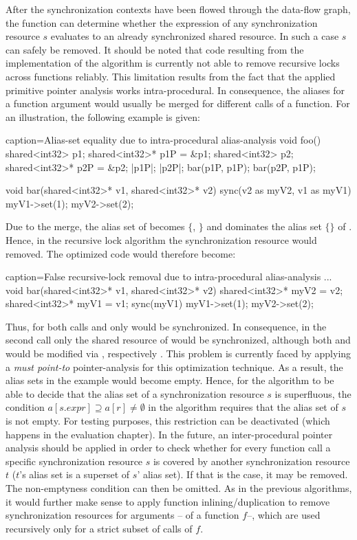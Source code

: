 After the synchronization contexts have been flowed through the data-flow graph, the function can determine whether the expression of any synchronization resource $s$ evaluates to an already synchronized shared resource. In such a case $s$ can safely be removed. It should be noted that code resulting from the implementation of the algorithm is currently not able to remove recursive locks across functions reliably. This limitation results from the fact that the applied primitive pointer analysis works intra-procedural. In consequence, the aliases for a function argument would usually be merged for different calls of a function. For an illustration, the following example is given:
\begin{ccode}{caption=Alias-set equality due to intra-procedural alias-analysis}
void foo() {
  shared<int32> p1; 
  shared<int32>* p1P = &p1; 
  shared<int32> p2; 
  shared<int32>* p2P = &p2;
  |p1P|; 
  |p2P|;
  bar(p1P, p1P);
  bar(p2P, p1P);
}

void bar(shared<int32>* v1, shared<int32>* v2) { 
  sync(v2 as myV2, v1 as myV1) { 
    myV1->set(1); 
    myV2->set(2); 
  } 
}
\end{ccode}
Due to the merge, the alias set of  becomes $\{$, $\}$ and dominates the alias set $\{$$\}$ of . Hence, in the recursive lock algorithm the synchronization resource  would removed. The optimized code would therefore become:
\begin{ccode}{caption=False recursive-lock removal due to intra-procedural alias-analysis}
...
void bar(shared<int32>* v1, shared<int32>* v2) { 
  shared<int32>* myV2 = v2; 
  shared<int32>* myV1 = v1;
  sync(myV1) { 
    myV1->set(1); 
    myV2->set(2); 
  } 
}
\end{ccode}
Thus, for both calls  and  only  would be synchronized. In consequence, in the second call only the shared resource of  would be synchronized, although both  and  would be modified via , respectively . This problem is currently faced by applying a \textit{must point-to} pointer-analysis for this optimization technique. As a result, the alias sets in the example would become empty. Hence, for the algorithm to be able to decide that the alias set of a synchronization resource $s$ is superfluous, the condition $a[s.\mathit{expr}] \supseteq a[r] \neq \emptyset$ in the algorithm requires that the alias set of $s$ is not empty. For testing purposes, this restriction can be deactivated (which happens in the evaluation chapter). In the future, an inter-procedural pointer analysis should be applied in order to check whether for every function call a specific synchronization resource $s$ is covered by another synchronization resource $t$ ($t$'s alias set is a superset of $s$' alias set). If that is the case, it may be removed. The non-emptyness condition can then be omitted. As in the previous algorithms, it would further make sense to apply function inlining/duplication to remove synchronization resources for arguments -- of a function $f$--, which are used recursively only for a strict subset of calls of $f$. 

